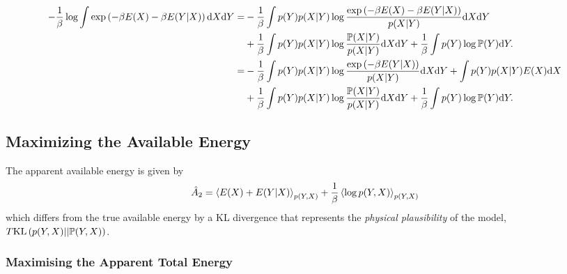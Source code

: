 \documentclass[]{article}
\begin{document}
\begin{align*}
-\frac{1}{\beta} \log \int \exp \left(-\beta E(X) -\beta E(Y | X)\right) \text{d}X \text{d}Y = & -\frac{1}{\beta} \int p(Y)p(X | Y) \log \frac{\exp\left(-\beta E(X) -\beta E(Y | X)\right)}{p(X|Y) }\text{d}X \text{d}Y  \\
& +\frac{1}{\beta} \int p(Y) p(X|Y) \log \frac{\mathbb{P}( X| Y)}{p( X | Y)}\text{d}X \text{d}Y + \frac{1}{\beta} \int p(Y)  \log  \mathbb{P}(  Y) \text{d}Y.\\
= & -\frac{1}{\beta} \int p(Y)p(X | Y) \log \frac{\exp\left( -\beta E(Y | X)\right)}{p(X|Y) }\text{d}X \text{d}Y + \int p(Y) p(X|Y) E(X) \text{d}X \\
& +\frac{1}{\beta} \int p(Y) p(X|Y) \log \frac{\mathbb{P}( X| Y)}{p( X | Y)}\text{d}X \text{d}Y + \frac{1}{\beta} \int p(Y)  \log  \mathbb{P}(  Y) \text{d}Y.
\end{align*}


\subsection{Maximizing the Available Energy}\label{maximizing-the-available-energy}

The apparent available energy is given by 
\[
\hat{A}_2 =  \left\langle E(X) +E(Y | X) \right\rangle_{p(Y, X)} + \frac{1}{\beta} \left\langle \log p(Y, X) \right\rangle_{p(Y, X)}
\] 
which differs from the true available energy by a KL divergence that
represents the \emph{physical plausibility} of the model,
\(T \text{KL}\left(p(Y, X) || \mathbb{P}(Y, X)\right)\).

\subsubsection{Maximising the Apparent Total Energy}\label{maximising-the-apparent-total-energy}
\end{document}
